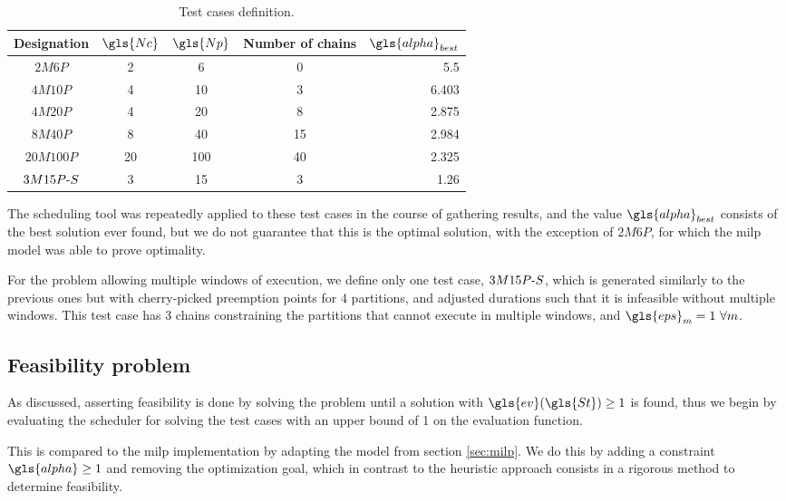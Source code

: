 \documentclass[main.tex]{subfiles}
\begin{document}
\begin{table}[htbp]
\centering
\caption{Test cases definition.}
\label{tab:cases}
\begin{tabular}{c c c c r}
    \toprule
    Designation & $\gls{Nc}$ & $\gls{Np}$ & Number of chains & $\gls{alpha}_{best}$ \\
    \midrule
    $2M6P$     & \num{2}  & \num{6}   & \num{0}  & \num{5.5}    \\
    $4M10P$    & \num{4}  & \num{10}  & \num{3}  & \num{6.403}  \\ 
    $4M20P$    & \num{4}  & \num{20}  & \num{8}  & \num{2.875}  \\ 
    $8M40P$    & \num{8}  & \num{40}  & \num{15} & \num{2.984}  \\
    $20M100P$  & \num{20} & \num{100} & \num{40} & \num{2.325}  \\
    \midrule
    $3M15P\text{-} S$ & \num{3} & \num{15} & \num{3} & \num{1.26} \\
    \bottomrule
\end{tabular}
\end{table}

The scheduling tool was repeatedly applied to these test cases in the course of gathering results, and the value $\gls{alpha}_{best}$ consists of the best solution ever found, but we do not guarantee that this is the optimal solution, with the exception of $2M6P$, for which the \gls{milp} model was able to prove optimality.

For the problem allowing multiple windows of execution, we define only one test case, $3M15P\text{-} S$, which is generated similarly to the previous ones but with cherry-picked preemption points for 4 partitions, and adjusted durations such that it is infeasible without multiple windows.
This test case has \num{3} chains constraining the partitions that cannot execute in multiple windows, and $\gls{eps}_{m}=1\ \forall m$.

\subsection{Feasibility problem}

As discussed, asserting feasibility is done by solving the problem until a solution with $\gls{ev}(\gls{St})\geq 1$ is found, thus we begin by evaluating the scheduler for solving the test cases with an upper bound of \num{1} on the evaluation function.

This is compared to the \gls{milp} implementation by adapting the model from section \ref{sec:milp}.
We do this by adding a constraint $\gls{alpha}\geq 1$ and removing the optimization goal, which in contrast to the heuristic approach consists in a rigorous method to determine feasibility.
\end{document}
